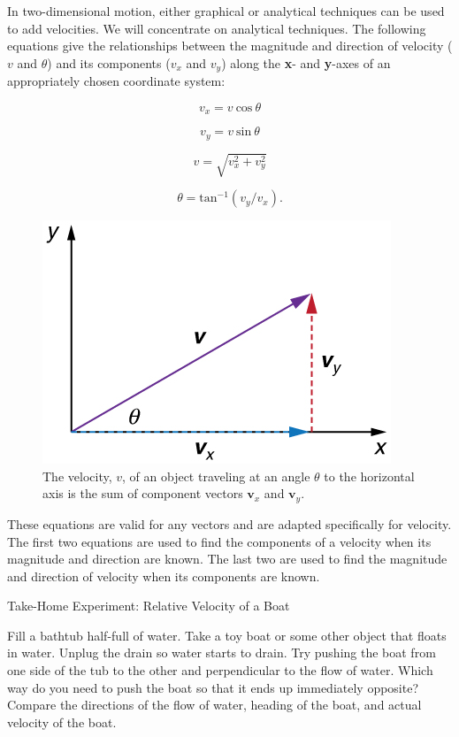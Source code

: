 \documentclass[
]{book}
\newenvironment{note}{}{}
\begin{document}
In two-dimensional motion, either graphical or analytical techniques can
be used to add velocities. We will concentrate on analytical techniques.
The following equations give the relationships between the magnitude and
direction of velocity (\(v{}\) and \(\theta{}\)) and its components
(\(v_{x}{}\) and \(v_{y}{}\)) along the \textbf{x}- and \textbf{y}-axes of an
appropriately chosen coordinate system:

\leavevmode\hypertarget{eip-343}{}%
\[{{v_{x} = v}\ \text{cos}\ \theta}{}\]

\leavevmode\hypertarget{eip-859}{}%
\[{{v_{y} = v\ }\text{sin}\ \theta}{}\]

\leavevmode\hypertarget{eip-505}{}%
\[{v = \sqrt{v_{x}^{2} + v_{y}^{2}}}{}\]

\leavevmode\hypertarget{eip-213}{}%
\[{{\theta = \text{tan}^{- 1}}({v_{y}/v_{x}})}.{}\]

\begin{figure}
\hypertarget{import-auto-id1382383}{%
\centering
\includegraphics{images/Figure_03_05_03a.jpg}
\caption{The velocity, \(v{}\), of an object traveling at an angle \(\theta{}\) to
the horizontal axis is the sum of component vectors \(\textbf{v}_{x}{}\)
and
\(\textbf{v}_{y}{}\).}\label{import-auto-id1382383}
}
\end{figure}

These equations are valid for any vectors and are adapted specifically
for velocity. The first two equations are used to find the components of
a velocity when its magnitude and direction are known. The last two are
used to find the magnitude and direction of velocity when its components
are known.

\hypertarget{fs-id2187811}{}
\begin{note}

Take-Home Experiment: Relative Velocity of a Boat

Fill a bathtub half-full of water. Take a toy boat or some other object
that floats in water. Unplug the drain so water starts to drain. Try
pushing the boat from one side of the tub to the other and perpendicular
to the flow of water. Which way do you need to push the boat so that it
ends up immediately opposite? Compare the directions of the flow of
water, heading of the boat, and actual velocity of the boat.

\end{note}
\end{document}
